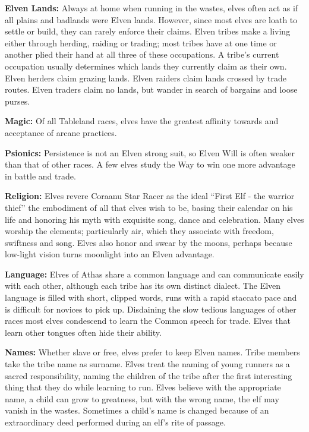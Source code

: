 \textbf{Elven Lands:} Always at home when running in the wastes, elves often act as if all plains and badlands were Elven lands. However, since most elves are loath to settle or build, they can rarely enforce their claims. Elven tribes make a living either through herding, raiding or trading; most tribes have at one time or another plied their hand at all three of these occupations. A tribe's current occupation usually determines which lands they currently claim as their own. Elven herders claim grazing lands. Elven raiders claim lands crossed by trade routes. Elven traders claim no lands, but wander in search of bargains and loose purses.

\textbf{Magic:} Of all Tableland races, elves have the greatest affinity towards and acceptance of arcane practices.

\textbf{Psionics:} Persistence is not an Elven strong suit, so Elven Will is often weaker than that of other races. A few elves study the Way to win one more advantage in battle and trade.

\textbf{Religion:} Elves revere Coraanu Star Racer as the ideal ``First Elf - the warrior thief'' the embodiment of all that elves wish to be, basing their calendar on his life and honoring his myth with exquisite song, dance and celebration. Many elves worship the elements; particularly air, which they associate with freedom, swiftness and song. Elves also honor and swear by the moons, perhaps because low-light vision turns moonlight into an Elven advantage.

\textbf{Language:} Elves of Athas share a common language and can communicate easily with each other, although each tribe has its own distinct dialect. The Elven language is filled with short, clipped words, runs with a rapid staccato pace and is difficult for novices to pick up. Disdaining the slow tedious languages of other races most elves condescend to learn the Common speech for trade. Elves that learn other tongues often hide their ability.

\textbf{Names:} Whether slave or free, elves prefer to keep Elven names. Tribe members take the tribe name as surname. Elves treat the naming of young runners as a sacred responsibility, naming the children of the tribe after the first interesting thing that they do while learning to run. Elves believe with the appropriate name, a child can grow to greatness, but with the wrong name, the elf may vanish in the wastes. Sometimes a child's name is changed because of an extraordinary deed performed during an elf's rite of passage.

